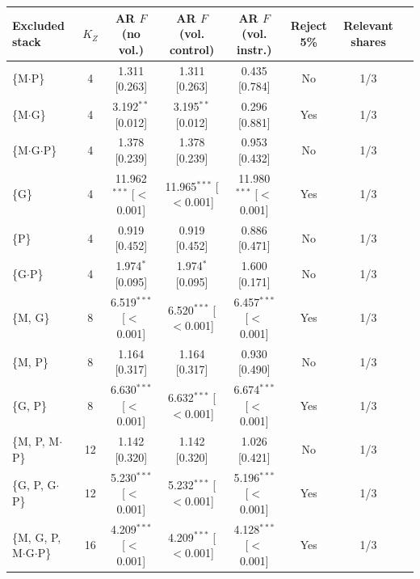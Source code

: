 \begin{tabular}{@{}lccccccc@{}}
\toprule
Excluded stack & $K_Z$ & AR $F$ (no vol.) & AR $F$ (vol. control) & AR $F$ (vol. instr.) & Reject 5\% & Relevant shares \\
\midrule
\{M$\cdot$P\} & 4 & 1.311 [0.263] & 1.311 [0.263] & 0.435 [0.784] & No & 1/3 \\
\{M$\cdot$G\} & 4 & 3.192$^{**}$ [0.012] & 3.195$^{**}$ [0.012] & 0.296 [0.881] & Yes & 1/3 \\
\{M$\cdot$G$\cdot$P\} & 4 & 1.378 [0.239] & 1.378 [0.239] & 0.953 [0.432] & No & 1/3 \\
\{G\} & 4 & 11.962$^{***}$ [$<$0.001] & 11.965$^{***}$ [$<$0.001] & 11.980$^{***}$ [$<$0.001] & Yes & 1/3 \\
\{P\} & 4 & 0.919 [0.452] & 0.919 [0.452] & 0.886 [0.471] & No & 1/3 \\
\{G$\cdot$P\} & 4 & 1.974$^{*}$ [0.095] & 1.974$^{*}$ [0.095] & 1.600 [0.171] & No & 1/3 \\
\{M, G\} & 8 & 6.519$^{***}$ [$<$0.001] & 6.520$^{***}$ [$<$0.001] & 6.457$^{***}$ [$<$0.001] & Yes & 1/3 \\
\{M, P\} & 8 & 1.164 [0.317] & 1.164 [0.317] & 0.930 [0.490] & No & 1/3 \\
\{G, P\} & 8 & 6.630$^{***}$ [$<$0.001] & 6.632$^{***}$ [$<$0.001] & 6.674$^{***}$ [$<$0.001] & Yes & 1/3 \\
\{M, P, M$\cdot$P\} & 12 & 1.142 [0.320] & 1.142 [0.320] & 1.026 [0.421] & No & 1/3 \\
\{G, P, G$\cdot$P\} & 12 & 5.230$^{***}$ [$<$0.001] & 5.232$^{***}$ [$<$0.001] & 5.196$^{***}$ [$<$0.001] & Yes & 1/3 \\
\{M, G, P, M$\cdot$G$\cdot$P\} & 16 & 4.209$^{***}$ [$<$0.001] & 4.209$^{***}$ [$<$0.001] & 4.128$^{***}$ [$<$0.001] & Yes & 1/3 \\
\bottomrule
\end{tabular}
